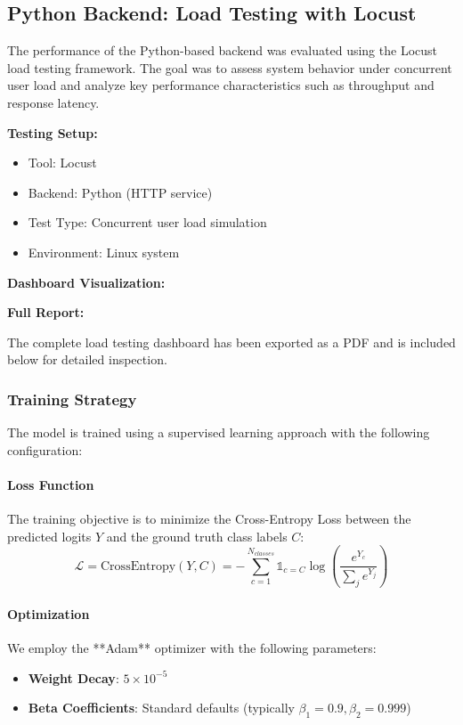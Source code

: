 \documentclass{ieeeaccess}
\begin{document}



\subsection{Python Backend: Load Testing with Locust}

The performance of the Python-based backend was evaluated using the Locust load testing framework. The goal was to assess system behavior under concurrent user load and analyze key performance characteristics such as throughput and response latency.

\textbf{Testing Setup:}
\begin{itemize}
    \item Tool: Locust
    \item Backend: Python (HTTP service)
    \item Test Type: Concurrent user load simulation
    \item Environment: Linux system
\end{itemize}

\textbf{Dashboard Visualization:}

\textbf{Full Report:}

The complete load testing dashboard has been exported as a PDF and is included below for detailed inspection.




\subsubsection{Training Strategy}
The model is trained using a supervised learning approach with the following configuration:

\paragraph{Loss Function}
The training objective is to minimize the Cross-Entropy Loss between the predicted logits $Y$ and the ground truth class labels $C$:
\begin{equation}
    \mathcal{L} = \text{CrossEntropy}(Y, C) = -\sum_{c=1}^{N_{classes}} \mathbb{1}_{c=C} \log\left(\frac{e^{Y_c}}{\sum_{j} e^{Y_j}}\right)
\end{equation}

\paragraph{Optimization}
We employ the **Adam** optimizer with the following parameters:
\begin{itemize}
    \item \textbf{Weight Decay}: $5 \times 10^{-5}$
    \item \textbf{Beta Coefficients}: Standard defaults (typically $\beta_1=0.9, \beta_2=0.999$)
\end{itemize}
\end{document}
